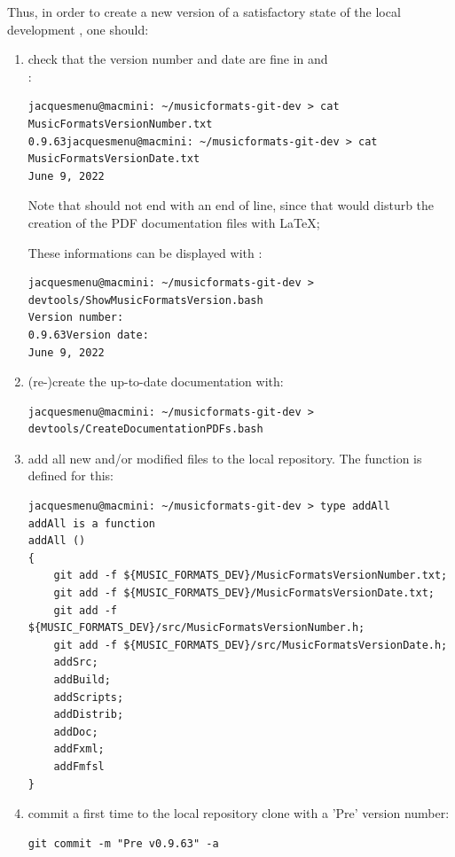 Thus, in order to create a new version of a satisfactory state of the local development \repo, one should:
\begin{enumerate}

\item check that the version number and date are fine in  and \\:
\begin{lstlisting}[language=TerminalSmall]
jacquesmenu@macmini: ~/musicformats-git-dev > cat MusicFormatsVersionNumber.txt
0.9.63jacquesmenu@macmini: ~/musicformats-git-dev > cat MusicFormatsVersionDate.txt
June 9, 2022
\end{lstlisting}
Note that  should not end with an end of line, since that would disturb the creation of the PDF documentation files with \LaTeX;

These informations can be displayed with :
\begin{lstlisting}[language=Terminal]
jacquesmenu@macmini: ~/musicformats-git-dev > devtools/ShowMusicFormatsVersion.bash
Version number:
0.9.63Version date:
June 9, 2022
\end{lstlisting}


\item (re-)create the up-to-date documentation with:
\begin{lstlisting}[language=TerminalSmall]
jacquesmenu@macmini: ~/musicformats-git-dev > devtools/CreateDocumentationPDFs.bash
\end{lstlisting}


\item add all new and/or modified files to the local repository. The  function is defined for this:
\begin{lstlisting}[language=Terminal]
jacquesmenu@macmini: ~/musicformats-git-dev > type addAll
addAll is a function
addAll ()
{
    git add -f ${MUSIC_FORMATS_DEV}/MusicFormatsVersionNumber.txt;
    git add -f ${MUSIC_FORMATS_DEV}/MusicFormatsVersionDate.txt;
    git add -f ${MUSIC_FORMATS_DEV}/src/MusicFormatsVersionNumber.h;
    git add -f ${MUSIC_FORMATS_DEV}/src/MusicFormatsVersionDate.h;
    addSrc;
    addBuild;
    addScripts;
    addDistrib;
    addDoc;
    addFxml;
    addFmfsl
}
\end{lstlisting}


\item commit a first time to the local repository clone with a 'Pre' version number:
\begin{lstlisting}[language=Terminal]
git commit -m "Pre v0.9.63" -a
\end{lstlisting}



\end{enumerate}
